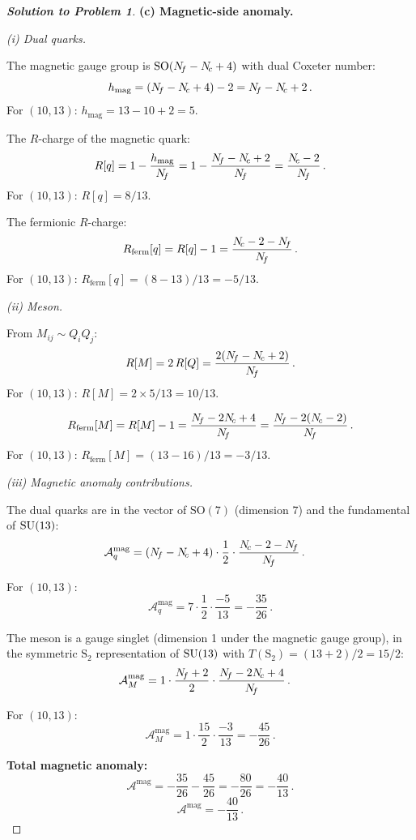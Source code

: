 \documentclass[11pt,a4paper]{article}
\newcommand{\SO}[1]{\mathrm{SO}(#1)}
\begin{document}
\begin{proof}[\textbf{Solution to Problem 1}]
\bigskip

\textbf{(c) Magnetic-side anomaly.}

\textit{(i) Dual quarks.}

The magnetic gauge group is $\SO{\Nf - \Nc + 4}$ with dual Coxeter
number:
\[
  h_{\text{mag}} = (N_{\!f} - N_{\!c} + 4) - 2 = N_{\!f} - N_{\!c} + 2\,.
\]
For $(10, 13)$: $h_{\text{mag}} = 13 - 10 + 2 = 5$.

The $R$-charge of the magnetic quark:
\[
  R[q] = 1 - \frac{h_{\text{mag}}}{N_{\!f}}
  = 1 - \frac{N_{\!f} - N_{\!c} + 2}{N_{\!f}}
  = \frac{N_{\!c} - 2}{N_{\!f}}\,.
\]
For $(10,13)$: $R[q] = 8/13$.

The fermionic $R$-charge:
\[
  R_{\text{ferm}}[q] = R[q] - 1 = \frac{N_{\!c} - 2 - N_{\!f}}{N_{\!f}}\,.
\]
For $(10,13)$: $R_{\text{ferm}}[q] = (8 - 13)/13 = -5/13$.

\textit{(ii) Meson.}

From $M_{ij} \sim Q_i Q_j$:
\[
  R[M] = 2\,R[Q] = \frac{2(N_{\!f} - N_{\!c} + 2)}{N_{\!f}}\,.
\]
For $(10,13)$: $R[M] = 2 \times 5/13 = 10/13$.

\[
  R_{\text{ferm}}[M] = R[M] - 1 = \frac{N_{\!f} - 2N_{\!c} + 4}{N_{\!f}}
  = \frac{N_{\!f} - 2(N_{\!c} - 2)}{N_{\!f}}\,.
\]
For $(10,13)$: $R_{\text{ferm}}[M] = (13 - 16)/13 = -3/13$.

\textit{(iii) Magnetic anomaly contributions.}

The dual quarks are in the vector of $\SO{7}$ (dimension $7$) and
the fundamental of $\mathrm{SU}(13)$:
\begin{align}
  \mathcal{A}^{\text{mag}}_q
  &= (N_{\!f} - N_{\!c} + 4) \cdot \frac{1}{2}
    \cdot \frac{N_{\!c} - 2 - N_{\!f}}{N_{\!f}}\,.
\end{align}

For $(10,13)$:
\[
  \mathcal{A}^{\text{mag}}_q
  = 7 \cdot \frac{1}{2} \cdot \frac{-5}{13}
  = -\frac{35}{26}\,.
\]

The meson is a gauge singlet (dimension 1 under the magnetic gauge
group), in the symmetric $\mathrm{S}_2$ representation of $\mathrm{SU}(13)$
with $T(\mathrm{S}_2) = (13+2)/2 = 15/2$:
\begin{align}
  \mathcal{A}^{\text{mag}}_M
  &= 1 \cdot \frac{N_{\!f} + 2}{2}
    \cdot \frac{N_{\!f} - 2N_{\!c} + 4}{N_{\!f}}\,.
\end{align}

For $(10,13)$:
\[
  \mathcal{A}^{\text{mag}}_M
  = 1 \cdot \frac{15}{2} \cdot \frac{-3}{13}
  = -\frac{45}{26}\,.
\]

\textbf{Total magnetic anomaly:}
\[
  \mathcal{A}^{\text{mag}}
  = -\frac{35}{26} - \frac{45}{26}
  = -\frac{80}{26}
  = -\frac{40}{13}\,.
\]
\[
  \boxed{\mathcal{A}^{\text{mag}} = -\frac{40}{13}\,.}
\]


\end{proof}
\end{document}
